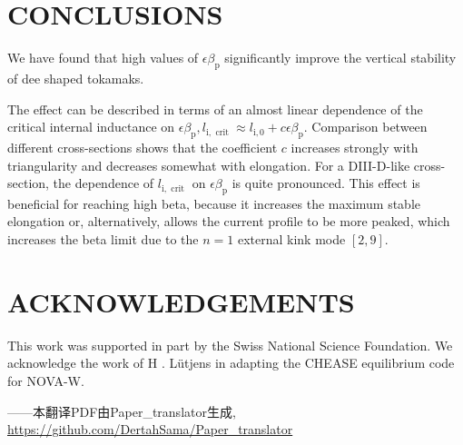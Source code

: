 \documentclass[utf8]{ctexart}
\begin{document}
\begin{sloppypar}
 \section{CONCLUSIONS}
 We have found that high values of $\epsilon \beta_{\mathrm{p}}$ significantly improve the vertical stability of dee shaped tokamaks.
 
 The effect can be described in terms of an almost linear dependence of the critical internal inductance on $\epsilon \beta_{\mathrm{p}}, l_{\mathrm{i}, \text { crit }} \approx l_{\mathrm{i}, 0}+c \epsilon \beta_{\mathrm{p}}$. Comparison between different cross-sections shows that the coefficient $c$ increases strongly with triangularity and decreases somewhat with elongation. For a DIII-D-like cross-section, the dependence of $l_{\mathrm{i}, \text { crit }}$ on $\epsilon \beta_{\mathrm{p}}$ is quite pronounced. This effect is beneficial for reaching high beta, because it increases the maximum stable elongation or, alternatively, allows the current profile to be more peaked, which increases the beta limit due to the $n=1$ external kink mode $[2,9]$.
 
 \section{ACKNOWLEDGEMENTS}
 This work was supported in part by the Swiss National Science Foundation. We acknowledge the work of H . Lütjens in adapting the CHEASE equilibrium code for NOVA-W.
 \setlength{\parskip}{0pt} \small %
 
 
 \end{sloppypar}	
 \begin{flushright}
 	\vfill \footnotesize
 	——本翻译PDF由Paper_translator生成, \url{https://github.com/DertahSama/Paper_translator}
 \end{flushright}
 
\end{document}
